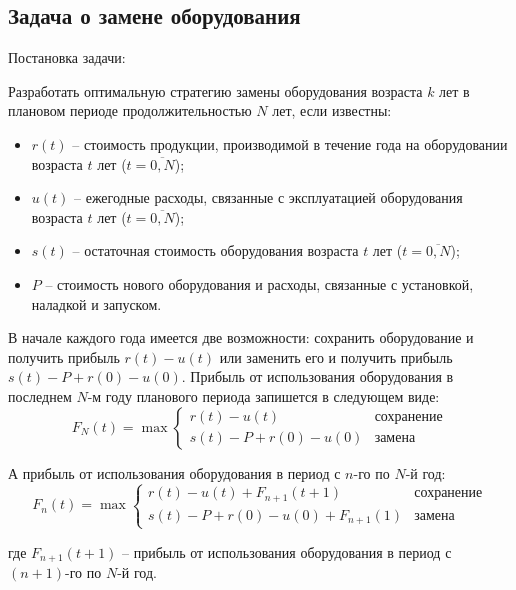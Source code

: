 \subsection{Задача о замене оборудования}

\indent Постановка задачи: 

Разработать оптимальную стратегию замены оборудования возраста $k$ лет в плановом периоде продолжительностью $N$ лет, если известны:
\begin{itemize}[label={}, wide]
    \item $r(t)$ -- стоимость продукции, производимой в течение года на оборудовании возраста $t$ лет ($t=\overline{0,N}$);
    \item $u(t)$ -- ежегодные расходы, связанные с эксплуатацией оборудования возраста $t$ лет ($t=\overline{0,N}$);
    \item $s(t)$ -- остаточная стоимость оборудования возраста $t$ лет ($t=\overline{0,N}$); 
    \item $P$ -- стоимость нового оборудования и расходы, связанные с установкой, наладкой и запуском.
\end{itemize}

В начале каждого года имеется две возможности: сохранить оборудование и получить прибыль $r(t)-u(t)$ или заменить его и получить прибыль $s(t)-P+r(0)-u(0)$. Прибыль от использования оборудования в последнем $N$-м году планового периода запишется в следующем виде:
\begin{equation}
    F_N(t) = \max\begin{cases}
                    r(t)-u(t) & \textit{сохранение}\\
                    s(t)-P+r(0)-u(0) & \textit{замена}
                \end{cases}
\end{equation}

А прибыль от использования оборудования в период с $n$-го по $N$-й год:
\begin{equation}
    F_n(t) = \max\begin{cases}
                    r(t)-u(t)+F_{n+1}(t+1) & \textit{сохранение}\\
                    s(t)-P+r(0)-u(0)+F_{n+1}(1) & \textit{замена}
                \end{cases}
\end{equation}

\noindent где $F_{n+1}(t+1)$ -- прибыль от использования оборудования в период с $(n+1)$-го по $N$-й год. 

